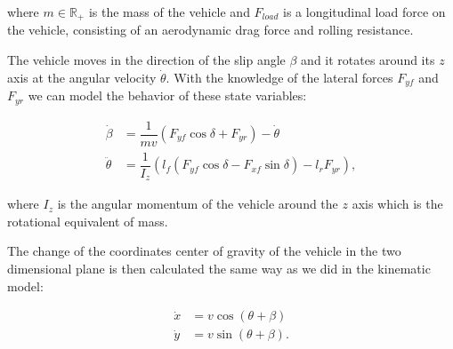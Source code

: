 where $m\in\mathbb{R}_+$ is the mass of the vehicle and $F_{load}$ is a longitudinal load force on the vehicle, consisting of an aerodynamic drag force and rolling resistance.

The vehicle moves in the direction of the slip angle $\beta$ and it rotates around its $z$ axis at the angular velocity $\dot{\theta}$. With the knowledge of the lateral forces $F_{yf}$ and $F_{yr}$ we can model the behavior of these state variables:

\begin{equation*}
\begin{aligned}
\dot{\beta}&=\dfrac{1}{mv}\left(F_{yf}\cos\delta+F_{yr}\right)-\dot{\theta} \\
\ddot{\theta}&=\dfrac{1}{I_z}\left(l_f \left(F_{yf}\cos\delta - F_{xf}\sin\delta \right) - l_r F_{yr}\right),
\end{aligned}
\end{equation*}

where $I_z$ is the angular momentum of the vehicle around the $z$ axis which is the rotational equivalent of mass.

The change of the coordinates center of gravity of the vehicle in the two dimensional plane is then calculated the same way as we did in the kinematic model:

\begin{equation*}
\begin{aligned}
\dot{x}&=v\cos\left(\theta + \beta\right) \\
\dot{y}&=v\sin\left(\theta + \beta\right).
\end{aligned}
\end{equation*}

